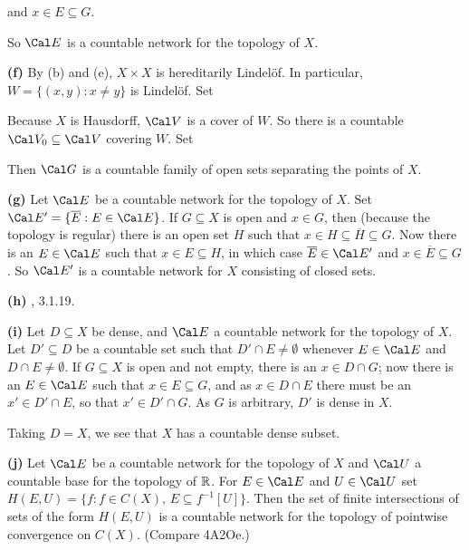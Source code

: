 {

\noindent and $x\in E\subseteq G$.\ \Qed

So $\Cal E$ is a countable network for the topology of $X$.

\medskip

{\bf (f)} By (b) and (e), $X\times X$ is hereditarily Lindel\"of.   In
particular, $W=\{(x,y):x\ne y\}$ is Lindel\"of.   Set


\noindent Because $X$ is Hausdorff, $\Cal V$ is a cover of $W$.   So
there is a countable $\Cal V_0\subseteq\Cal V$ covering $W$.   Set


\noindent Then $\Cal G$ is a countable family of open sets separating
the points of $X$.

\medskip

{\bf (g)} Let $\Cal E$ be a countable network
for the topology of $X$.   Set $\Cal E'=\{\overline{E}:E\in\Cal E\}$.
If $G\subseteq X$ is open and $x\in G$, then (because the topology is
regular) there is an open set $H$ such that
$x\in H\subseteq\overline{H}\subseteq G$.   Now there is an $E\in\Cal E$
such that $x\in E\subseteq H$, in
which case $\overline{E}\in\Cal E'$ and $x\in\overline{E}\subseteq G$.
So $\Cal E'$ is a countable network for $X$ consisting of closed
sets.

\medskip

{\bf (h)} \Engelking, 3.1.19.

\medskip

{\bf (i)} Let $D\subseteq X$ be dense, and $\Cal E$ a countable network
for the topology of $X$.   Let $D'\subseteq D$ be a countable set such
that $D'\cap E\ne\emptyset$ whenever $E\in\Cal E$ and
$D\cap E\ne\emptyset$.   If $G\subseteq X$ is open and not empty, there
is an $x\in D\cap G$;  now there is an $E\in\Cal E$ such that
$x\in E\subseteq G$, and as $x\in D\cap E$ there must be an
$x'\in D'\cap E$, so that $x'\in D'\cap G$.   As $G$ is arbitrary, $D'$
is dense in $X$.

Taking $D=X$, we see that $X$ has a countable dense subset.

\medskip

{\bf (j)} Let $\Cal E$ be a countable network for the topology of $X$
and $\Cal U$ a countable base for the topology of
$\Bbb R$.   For
$E\in\Cal E$ and $U\in\Cal U$ set
$H(E,U)=\{f:f\in C(X),\,E\subseteq f^{-1}[U]\}$.   Then the set of
finite intersections of sets of the form $H(E,U)$ is a countable network
for the topology of pointwise convergence on $C(X)$.
(Compare 4A2Oe.)
}%

